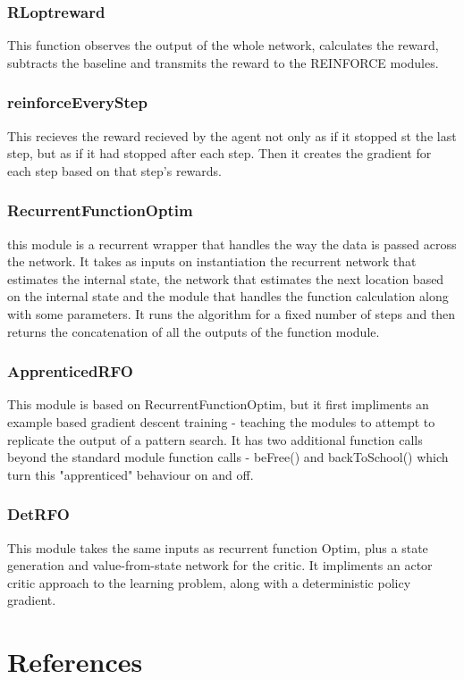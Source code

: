 \subsubsection{RLoptreward}%
This function observes the output of the whole network, calculates the reward, subtracts the baseline and transmits the reward to the REINFORCE modules.

\subsubsection{reinforceEveryStep}
This recieves the reward recieved by the agent not only as if it stopped st the last step, but as if it had stopped after each step. Then it creates the gradient for each step based on that step's rewards.
\subsubsection{RecurrentFunctionOptim}
this module is a recurrent wrapper that handles the way the data is passed across the network. It takes as inputs on instantiation the recurrent network that estimates the internal state, the network that estimates the next location based on the internal state and the module that handles the function calculation along with some parameters. It runs the algorithm for a fixed number of steps and then returns the concatenation of all the outputs of the function module.

\subsubsection{ApprenticedRFO}
This module is based on RecurrentFunctionOptim, but it first impliments an example based gradient descent training - teaching the modules to attempt to replicate the output of a pattern search. It has two additional function calls beyond the standard module function calls - beFree() and backToSchool() which turn this "apprenticed" behaviour on and off.

\subsubsection{DetRFO}
This module takes the same inputs as recurrent function Optim, plus a state generation and value-from-state network for the critic. It impliments an actor critic approach to the learning problem, along with a deterministic policy gradient.



\section{References}
\printbibliography[omitnumbers = false]